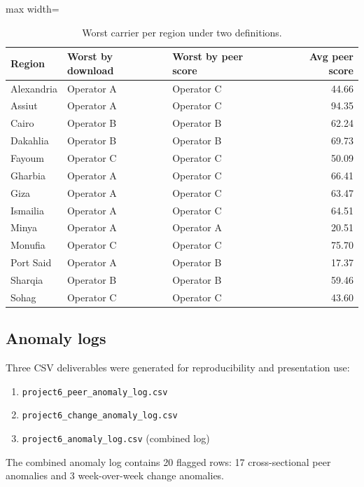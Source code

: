 \documentclass[12pt,a4paper]{article}
\begin{document}
\begin{table}[htbp]
\centering
\small
\begin{adjustbox}{max width=\textwidth}
\begin{tabular}{l l l r}
\toprule
Region & Worst by download & Worst by peer score & Avg peer score \\
\midrule
Alexandria & Operator A & Operator C & 44.66 \\
Assiut & Operator A & Operator C & 94.35 \\
Cairo & Operator B & Operator B & 62.24 \\
Dakahlia & Operator B & Operator B & 69.73 \\
Fayoum & Operator C & Operator C & 50.09 \\
Gharbia & Operator A & Operator C & 66.41 \\
Giza & Operator A & Operator C & 63.47 \\
Ismailia & Operator A & Operator C & 64.51 \\
Minya & Operator A & Operator A & 20.51 \\
Monufia & Operator C & Operator C & 75.70 \\
Port Said & Operator A & Operator B & 17.37 \\
Sharqia & Operator B & Operator B & 59.46 \\
Sohag & Operator C & Operator C & 43.60 \\
\bottomrule
\end{tabular}
\end{adjustbox}
\caption{Worst carrier per region under two definitions.}
\label{tab:worst}
\end{table}

\subsection{Anomaly logs}

Three CSV deliverables were generated for reproducibility and presentation use:

\begin{enumerate}[label=\arabic*.]
    \item \texttt{project6\_peer\_anomaly\_log.csv}
    \item \texttt{project6\_change\_anomaly\_log.csv}
    \item \texttt{project6\_anomaly\_log.csv} (combined log)
\end{enumerate}

The combined anomaly log contains 20 flagged rows: 17 cross-sectional peer anomalies and 3 week-over-week change anomalies.
\end{document}
